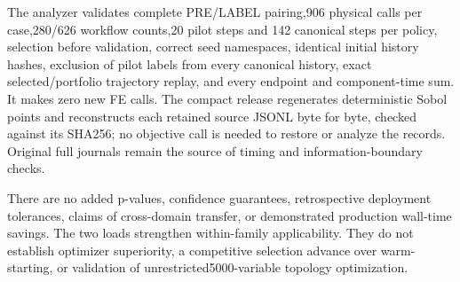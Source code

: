 \documentclass[suppldata]{interact}
\begin{document}
\endgroup

The analyzer validates complete PRE/LABEL pairing,906 physical calls per case,280/626 workflow counts,20 pilot steps and 142 canonical steps per policy, selection before validation, correct seed namespaces, identical initial history hashes, exclusion of pilot labels from every canonical history, exact selected/portfolio trajectory replay, and every endpoint and component-time sum. It makes zero new FE calls. The compact release regenerates deterministic Sobol points and reconstructs each retained source JSONL byte for byte, checked against its SHA256; no objective call is needed to restore or analyze the records. Original full journals remain the source of timing and information-boundary checks.

There are no added p-values, confidence guarantees, retrospective deployment tolerances, claims of cross-domain transfer, or demonstrated production wall-time savings. The two loads strengthen within-family applicability. They do not establish optimizer superiority, a competitive selection advance over warm-starting, or validation of unrestricted5000-variable topology optimization.






\end{document}
